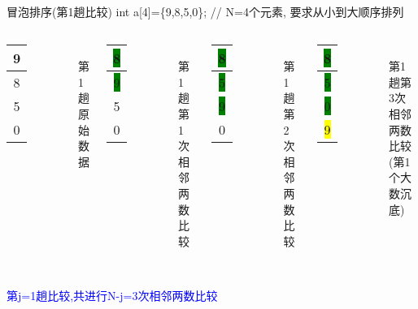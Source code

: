 \begin{frame}{冒泡排序(第1趟比较)}
int a[4]=\{9,8,5,0\}; // N=4个元素, 要求从小到大顺序排列
\begin{columns}[T]
	\begin{tabular}{|c|}
		\hline 
		9 \\ 
		\hline 
		8 \\ 
		\hline 
		5 \\ 
		\hline
		0 \\
	    \hline 
	\end{tabular}\\ 
    第1趟原始数据
	\pause
	\begin{tabular}{|c|}
		\hline 
		\colorbox{green}{8} \\ 
		\hline 
		\colorbox{green}{9} \\ 
		\hline 
		5 \\ 
		\hline
		0 \\
		\hline  
	\end{tabular}\\ 
    第1趟第1次相邻两数比较
    \pause
    \begin{tabular}{|c|}
    	\hline 
    	\colorbox{green}{8} \\ 
    	\hline 
    	\colorbox{green}{5} \\ 
    	\hline 
    	\colorbox{green}{9} \\ 
    	\hline 
    	0 \\
    	\hline 
    \end{tabular}\\ 
    第1趟第2次相邻两数比较
    \pause
    \begin{tabular}{|c|}
    	\hline 
    	\colorbox{green}{8} \\ 
    	\hline 
    	\colorbox{green}{5} \\ 
    	\hline 
    	\colorbox{green}{0} \\ 
    	\hline 
    	\colorbox{yellow}{9} \\
    	\hline 
    \end{tabular}\\ 
    第1趟第3次相邻两数比较(第1个大数沉底)
\end{columns}
~\\
\textcolor{blue}{第j=1趟比较,共进行N-j=3次相邻两数比较}
\end{frame}

